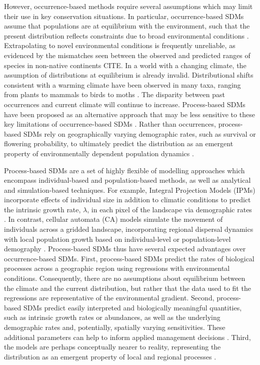 \documentclass[preprint,review,times,12pt]{elsarticle}
\begin{document}
However, occurrence-based methods require several assumptions which may limit their use in key conservation situations. In particular, occurrence-based SDMs assume that populations are at equilibrium with the environment, such that the present distribution reflects constraints due to broad environmental conditions \citep{Elith2009}. Extrapolating to novel environmental conditions is frequently unreliable, as evidenced by the mismatches seen between the observed and predicted ranges of species in non-native continents CITE. In a world with a changing climate, the assumption of distributions at equilibrium is already invalid. Distributional shifts consistent with a warming climate have been observed in many taxa, ranging from plants \citep{Lenoir2010,Engler2011} to mammals \citep{Moritz2008a,Rowe2015} to birds \citep{Tingley2009a,Tingley2012} to moths \citep{Chen2009b}. The disparity between past occurrences and current climate will continue to increase. Process-based SDMs have been proposed as an alternative approach that may be less sensitive to these key limitations of occurrence-based SDMs \citep{Merow2011a,Evans2016,Merow2017,Cabral2017}. Rather than occurrences, process-based SDMs rely on geographically varying demographic rates, such as survival or flowering probability, to ultimately predict the distribution as an emergent property of environmentally dependent population dynamics \citep{Evans2016,Cabral2017}.

Process-based SDMs are a set of highly flexible of modelling approaches which encompass individual-based and population-based methods, as well as analytical and simulation-based techniques. For example, Integral Projection Models (IPMs) incorporate effects of individual size in addition to climatic conditions to predict the intrinsic growth rate, $\lambda$, in each pixel of the landscape via demographic rates \citep{Easterling2000,Merow2017}. In contrast, cellular automata (CA) models simulate the movement of individuals across a gridded landscape, incorporating regional dispersal dynamics with local population growth based on individual-level or population-level demography \citep{Merow2011a,Szewczyk2019}. Process-based SDMs thus have several expected advantages over occurrence-based SDMs. First, process-based SDMs predict the rates of biological processes across a geographic region using regressions with environmental conditions. Consequently, there are no assumptions about equilibrium between the climate and the current distribution, but rather that the data used to fit the regressions are representative of the environmental gradient. Second, process-based SDMs predict easily interpreted and biologically meaningful quantities, such as intrinsic growth rates or abundances, as well as the underlying demographic rates and, potentially, spatially varying sensitivities. These additional parameters can help to inform applied management decisions \citep{Matzek2015,Szewczyk2019}. Third, the models are perhaps conceptually nearer to reality, representing the distribution as an emergent property of local and regional processes \citep{Merow2014b,Evans2016}.
\end{document}
